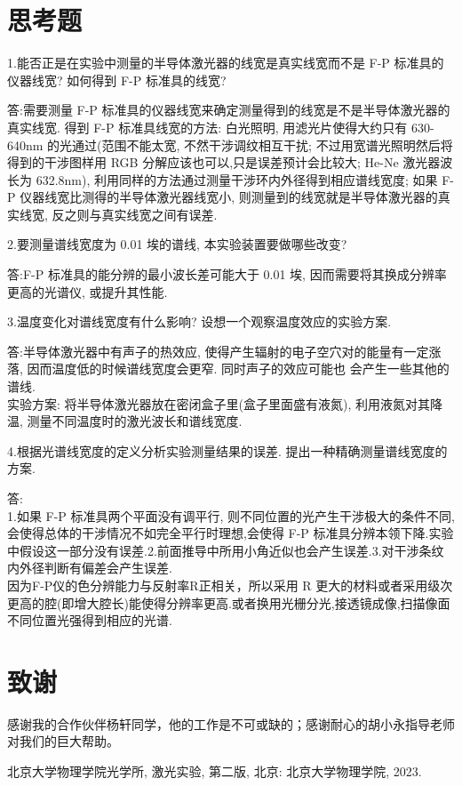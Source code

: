 \documentclass[aps,pre,12pt,preprint,%
	onecolumn,showpacs,showkeys,nofootinbib]{revtex4-2}
\begin{document}
\section{思考题}
1.能否正是在实验中测量的半导体激光器的线宽是真实线宽而不是 F-P 标准具的仪器线宽? 如何得到 F-P 标准具的线宽?
\par 答:需要测量 F-P 标准具的仪器线宽来确定测量得到的线宽是不是半导体激光器的真实线宽. 得到 F-P 标准具线宽的方法: 白光照明, 用滤光片使得大约只有 630-640nm 的光通过(范围不能太宽, 不然干涉调纹相互干扰; 不过用宽谱光照明然后将得到的干涉图样用 RGB 分解应该也可以,只是误差预计会比较大; He-Ne 激光器波长为 632.8nm), 利用同样的方法通过测量干涉环内外径得到相应谱线宽度; 如果 F-P 仪器线宽比测得的半导体激光器线宽小, 则测量到的线宽就是半导体激光器的真实线宽, 反之则与真实线宽之间有误差.

2.要测量谱线宽度为 0.01 埃的谱线, 本实验装置要做哪些改变? 
\par 答:F-P 标准具的能分辨的最小波长差可能大于 0.01 埃, 因而需要将其换成分辨率更高的光谱仪, 或提升其性能.

3.温度变化对谱线宽度有什么影响? 设想一个观察温度效应的实验方案. 
\par 答:半导体激光器中有声子的热效应, 使得产生辐射的电子空穴对的能量有一定涨落, 因而温度低的时候谱线宽度会更窄. 同时声子的效应可能也
会产生一些其他的谱线.\\
实验方案: 将半导体激光器放在密闭盒子里(盒子里面盛有液氮), 利用液氮对其降温, 测量不同温度时的激光波长和谱线宽度.

4.根据光谱线宽度的定义分析实验测量结果的误差. 提出一种精确测量谱线宽度的方案. 
\par 答:\\1.如果 F-P 标准具两个平面没有调平行, 则不同位置的光产生干涉极大的条件不同, 会使得总体的干涉情况不如完全平行时理想,会使得 F-P 标准具分辨本领下降.实验中假设这一部分没有误差.2.前面推导中所用小角近似也会产生误差.3.对干涉条纹内外径判断有偏差会产生误差.\\
因为F-P仪的色分辨能力与反射率R正相关，所以采用 R 更大的材料或者采用级次更高的腔(即增大腔长)能使得分辨率更高.或者换用光栅分光,接透镜成像,扫描像面不同位置光强得到相应的光谱. 
\section{致谢}
	感谢我的合作伙伴杨轩同学，他的工作是不可或缺的；感谢耐心的胡小永指导老师对我们的巨大帮助。
\begin{thebibliography}{99}
	北京大学物理学院光学所, 激光实验, 第二版, 北京: 北京大学物理学院, 2023.
\end{thebibliography}
\clearpage
\end{document}
